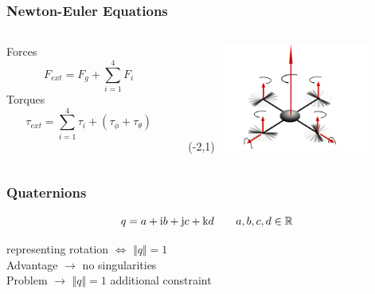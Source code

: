 \begin{frame}
	\frametitle{Newton-Euler Equations}
	\begin{columns}[T] %
\begin{column}{0.70\textwidth}
		Forces \\
		\[ F_{ext} = F_{g} + \sum_{i=1}^{4}{F_{i}} \]
		Torques \\
		\[ \tau_{ext} = \sum_{i=1}^{4}{\tau_{i}}+(\tau_{\phi}+\tau_{\theta}) \]
\end{column}
\hfill
\begin{column}{.25\textwidth}
	\begin{textblock}{0}(-2,1)
    \includegraphics[width=5cm]{images/Kraefte.pdf}
		\label{fig:Kraefte klein}
  \end{textblock}
\end{column}
\end{columns}
		
\end{frame}
		
	
	\begin{frame}
		\frametitle{Quaternions}
		\begin{block}{}
			\[ q = a + \textup{i}b+\textup{j}c+\textup{k}d \qquad a, b, c, d \in \mathbb{R} \]
			\end{block}
			\vspace{1em}
			representing rotation \( \Leftrightarrow \) \( \Vert q \Vert = 1 \) \\
			\vspace{1em}			
			Advantage \(\rightarrow\) no singularities \\
			\vspace{1em}
			Problem \(\rightarrow\) \( \Vert q \Vert = 1 \) additional constraint
	\end{frame}
	
